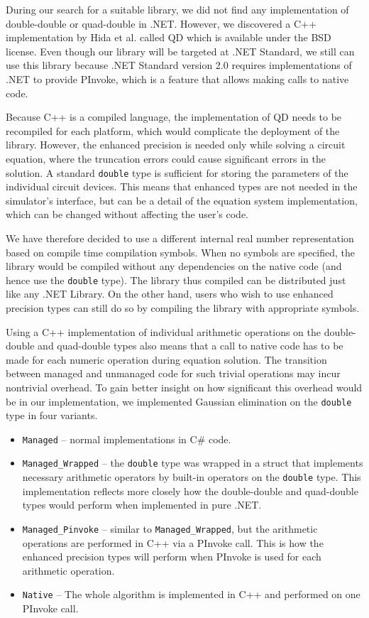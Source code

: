 During our search for a suitable library, we did not find any implementation of double-double or quad-double in .NET. However, we discovered a C++ implementation by Hida et al. called QD \cite{qd-lib} which is available under the BSD license. Even though our library will be targeted at .NET Standard, we still can use this library because .NET Standard version 2.0 requires implementations of .NET to provide PInvoke, which is a feature that allows making calls to native code.

Because C++ is a compiled language, the implementation of QD needs to be recompiled for each platform, which would complicate the deployment of the library. However, the enhanced precision is needed only while solving a circuit equation, where the truncation errors could cause significant errors in the solution. A standard \texttt{double} type is sufficient for storing the parameters of the individual circuit devices. This means that enhanced types are not needed in the simulator's interface, but can be a detail of the equation system implementation, which can be changed without affecting the user's code.

We have therefore decided to use a different internal real number representation based on compile time compilation symbols. When no symbols are specified, the library would be compiled without any dependencies on the native code (and hence use the \texttt{double} type). The library thus compiled can be distributed just like any .NET Library. On the other hand, users who wish to use enhanced precision types can still do so by compiling the library with appropriate symbols.

Using a C++ implementation of individual arithmetic operations on the double-double and quad-double types also means that a call to native code has to be made for each numeric operation during equation solution. The transition between managed and unmanaged code for such trivial operations may incur nontrivial overhead. To gain better insight on how significant this overhead would be in our implementation, we implemented Gaussian elimination on the \texttt{double} type in four variants.

\begin{itemize}
	\item \texttt{Managed} -- normal implementations in C\# code.
	\item \texttt{Managed\_Wrapped} -- the \texttt{double} type was wrapped in a struct that implements necessary arithmetic operators by built-in operators on the \texttt{double} type. This implementation reflects more closely how the double-double and quad-double types would perform when implemented in pure .NET.
	\item \texttt{Managed\_Pinvoke} -- similar to \texttt{Managed\_Wrapped}, but the arithmetic operations are performed in C++ via a PInvoke call. This is how the enhanced precision types will perform when PInvoke is used for each arithmetic operation.
	\item \texttt{Native} -- The whole algorithm is implemented in C++ and performed on one PInvoke call.	
\end{itemize}

